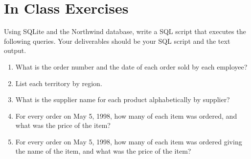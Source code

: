 \documentclass{article}
\begin{document}
    \section{In Class Exercises}
Using SQLite and the Northwind database, write a SQL script that executes the following queries. Your deliverables should be your SQL script and the text output.

        \begin{enumerate}
            \item What is the order number and the date of each order sold by each employee?
            \item List each territory by region.
            \item What is the supplier name for each product alphabetically by supplier?
            \item For every order on May 5, 1998, how many of each item was ordered, and what was the price of the item?
            \item For every order on May 5, 1998, how many of each item was ordered giving the name of the item, and what was the price of the item?

\end{enumerate}
\end{document}
